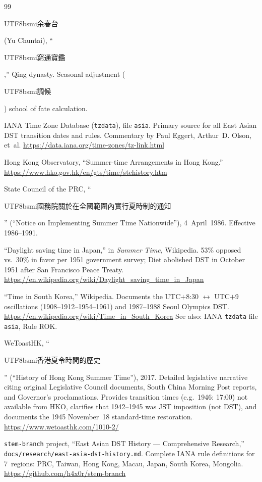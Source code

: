 \documentclass[10pt,a4paper]{article}
\newcommand{\zh}[1]{\begin{CJK}{UTF8}{bsmi}#1\end{CJK}}
\begin{document}
\begin{sloppypar}
\begin{thebibliography}{99}
\zh{余春台} (Yu Chuntai), ``\zh{窮通寶鑑},'' Qing dynasty.
Seasonal adjustment (\zh{調候}) school of fate calculation.


IANA Time Zone Database (\texttt{tzdata}), file \texttt{asia}.
Primary source for all East Asian DST transition dates and rules.
Commentary by Paul Eggert, Arthur~D. Olson, et~al.
\url{https://data.iana.org/time-zones/tz-link.html}

Hong Kong Observatory, ``Summer-time Arrangements in Hong Kong.''
\url{https://www.hko.gov.hk/en/gts/time/stehistory.htm}

State Council of the PRC, ``\zh{國務院關於在全國範圍內實行夏時制的通知}''
(``Notice on Implementing Summer Time Nationwide''),
4~April~1986. Effective 1986--1991.

``Daylight saving time in Japan,'' in \textit{Summer Time}, Wikipedia.
53\% opposed vs.\ 30\% in favor per 1951 government survey;
Diet abolished DST in October 1951 after San Francisco Peace Treaty.
\url{https://en.wikipedia.org/wiki/Daylight_saving_time_in_Japan}

``Time in South Korea,'' Wikipedia.
Documents the UTC$+$8:30 $\leftrightarrow$ UTC$+$9 oscillations
(1908--1912--1954--1961) and 1987--1988 Seoul Olympics DST.
\url{https://en.wikipedia.org/wiki/Time_in_South_Korea}
See also: IANA \texttt{tzdata} file \texttt{asia}, Rule ROK.

WeToastHK, ``\zh{香港夏令時間的歷史}'' (``History of Hong Kong
Summer Time''), 2017.
Detailed legislative narrative citing original Legislative Council
documents, South China Morning Post reports, and Governor's proclamations.
Provides transition times (e.g.\ 1946: 17:00) not available from HKO,
clarifies that 1942--1945 was JST imposition (not DST), and documents
the 1945 November~18 standard-time restoration.
\url{https://www.wetoasthk.com/1010-2/}

\texttt{stem-branch} project, ``East Asian DST History ---
Comprehensive Research,'' \texttt{docs/research/east-asia-dst-history.md}.
Complete IANA rule definitions for 7~regions: PRC, Taiwan, Hong Kong,
Macau, Japan, South Korea, Mongolia.
\url{https://github.com/h4x0r/stem-branch}



\end{thebibliography}
\end{sloppypar}
\end{document}
